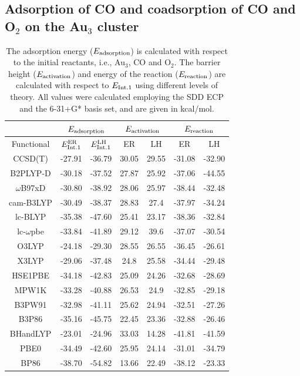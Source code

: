 \subsection{Adsorption of CO and coadsorption of CO and O$_{2}$ on the Au$_3$ cluster}
\begin{table}[!t]
\caption{The adsorption energy ($E_{\rm{adsorption}}$) is calculated with respect to the initial reactants, i.e., Au$_3$, CO and O$_2$. The barrier height ($E_{\rm{activation}}$) and energy of the reaction ($E_{\rm{reaction}}$) are calculated with respect to $E_{\rm{Int.1}}$ using different levels of theory. All values were calculated employing the SDD ECP and the 6-31+G* basis set, and are given in kcal/mol.} \label{error-bars}
\begin{small}
\begin{adjustbox}{max width=0.49\textwidth}
\begin{tabular}{|c|cc|cc|cc|}
\hline
 & \multicolumn{2}{c|}{$E_{\rm{adsorption}}$} & \multicolumn{2}{c|}{$E_{\rm{activation}}$} & \multicolumn{2}{c|}{$E_{\rm{reaction}}$}\\
\hline
Functional&$E_{\rm{Int.1}}^{\rm{ER}}$&$E_{\rm{Int.1}}^{\rm{LH}} $ &ER&LH&ER&LH\\
\hline
CCSD(T) &-27.91&-36.79&30.05&29.55&-31.08&-32.90\\
 B2PLYP-D&-30.18&-37.52&27.87&25.92&-37.06&-44.55\\
$\omega$B97xD&-30.80&-38.92&28.06&25.97&-38.44&-32.48\\
 cam-B3LYP&-30.49&-38.37&28.83&27.4&-37.97&-34.24\\
 lc-BLYP&-35.38&-47.60&25.41&23.17&-38.36&-32.84\\
  lc-$\omega$pbe&-33.84&-41.89&29.12&39.6&-37.07&-30.54\\
 O3LYP&-24.18&-29.30&28.55&26.55&-36.45&-26.61\\
X3LYP&-29.06&-37.48&24.8&25.58&-34.44&-29.48\\
HSE1PBE&-34.18&-42.83&25.09&24.26&-32.68&-28.69\\
MPW1K&-33.28&-40.88&26.53&24.9&-32.85&-29.18\\
B3PW91&-32.98&-41.11&25.62&24.94&-32.51&-27.26\\
B3P86&-35.16&-45.75&22.45&23.36&-32.88&-26.46\\
BHandLYP&-23.01&-24.96&33.03&14.28&-41.81&-41.59\\
PBE0&-34.49&-42.60&25.95&24.14&-31.01&-34.79\\
 BP86&-38.70&-54.82&13.66&22.49&-38.12&-23.33\\

\end{tabular}
\end{adjustbox}
\end{small}
\end{table}
